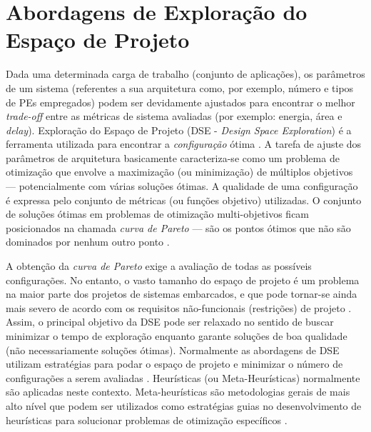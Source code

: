 \documentclass[tese-proposta,nocipinfo]{texufpel}
\begin{document}
\section{Abordagens de Exploração do Espaço de Projeto}

Dada uma determinada carga de trabalho (conjunto de aplicações), os parâmetros de um sistema (referentes a sua arquitetura como, por exemplo, número e tipos de PEs empregados) podem ser devidamente ajustados para encontrar o melhor \textit{trade-off} entre as métricas de sistema avaliadas (por exemplo: energia, área e \textit{delay}). Exploração do Espaço de Projeto (DSE - \textit{Design Space Exploration}) é a ferramenta utilizada para encontrar a \textit{configuração} ótima \cite{Panerati2017}. A tarefa de ajuste dos parâmetros de arquitetura basicamente caracteriza-se como um problema de otimização que envolve a maximização (ou minimização) de múltiplos objetivos --- potencialmente com várias soluções ótimas. A qualidade de uma configuração é expressa pelo conjunto de métricas (ou funções objetivo) utilizadas. O conjunto de soluções ótimas em problemas de otimização multi-objetivos ficam posicionados na chamada \textit{curva de Pareto} --- são os pontos ótimos que não são dominados por nenhum outro ponto \cite{Panerati2017}. 

A obtenção da \textit{curva de Pareto} exige a avaliação de todas as possíveis configurações. No entanto, o vasto tamanho do espaço de projeto é um problema na maior parte dos projetos de sistemas embarcados, e que pode tornar-se ainda mais severo de acordo com os requisitos não-funcionais (restrições) de projeto \cite{Glab2017}. Assim, o principal objetivo da DSE pode ser relaxado no sentido de buscar minimizar o tempo de exploração enquanto garante soluções de boa qualidade \cite{Ascia2011382} (não necessariamente soluções ótimas). Normalmente as abordagens de DSE utilizam estratégias para podar o espaço de projeto e minimizar o número de configurações a serem avaliadas \cite{Ascia2011382}. Heurísticas (ou Meta-Heurísticas) normalmente são aplicadas neste contexto. Meta-heurísticas são metodologias gerais de mais alto nível que podem ser utilizados como estratégias guias no desenvolvimento de heurísticas para solucionar problemas de otimização específicos \cite[p. 1.]{talbi2009metaheuristics}.
\end{document}
